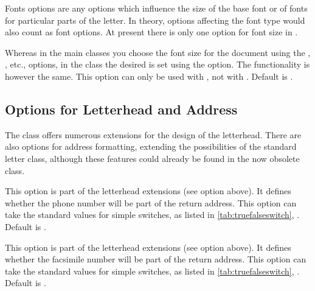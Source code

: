 Fonts options are any options which influence the size of the base
font or of fonts for particular parts of the letter. In theory,
options affecting the font type would also count as font options. At
present there is only one option for font size in .

\begin{Declaration}
\end{Declaration}
%
Whereas in the main classes you choose the font size
for the document using the \Option{10pt}, \Option{12pt}, etc.,
options, in the  class the desired  is set
using the  option. The functionality is however the
same. This option can only be used with , not
with .  Default is \PValue{12pt}.
%
%

\subsection{Options for Letterhead and Address}
\label{sec:scrlttr2.headoptions}
%

The  class offers numerous extensions for the design
of the letterhead.  There are also options for address formatting,
extending the possibilities of the standard letter class, although
these features could already be found in the now obsolete
 class.


\begin{Declaration}
\end{Declaration}
%
This option is part of the letterhead extensions (see option
 above). It defines whether the phone number will be
part of the return address.  This option can take the standard values
for simple switches, as listed in
\autoref{tab:truefalseswitch},
. Default is
.
%
%

\begin{Declaration}
\end{Declaration}
%
This option is part of the letterhead extensions (see option
 above). It defines whether the facsimile number
will be part of the return address.  This option can take the standard
values for simple switches, as listed in
\autoref{tab:truefalseswitch},
. Default is
.
%
%

